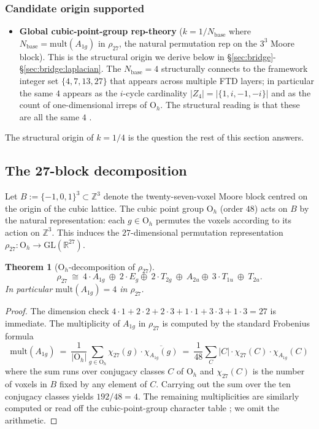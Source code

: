 \documentclass[11pt,reqno]{amsart}
\theoremstyle{plain}
\newtheorem{theorem}{Theorem}[section]
\theoremstyle{definition}
\theoremstyle{remark}
\numberwithin{equation}{section}
\newcommand{\Ohgrp}{\mathrm{O}_h}
\newcommand{\Aoneg}{A_{1g}}
\newcommand{\Nbase}{N_{\mathrm{base}}}
\begin{document}
\subsubsection*{Candidate origin supported}

\begin{itemize}
\item \textbf{Global cubic-point-group rep-theory} ($k = 1/\Nbase$
where $\Nbase = \mathrm{mult}(\Aoneg)$ in $\rho_{27}$, the natural
permutation rep on the $3^{3}$ Moore block). This is the structural
origin we derive below in \S\ref{sec:bridge}-\S\ref{sec:bridge:laplacian}.
The $\Nbase = 4$ structurally connects to the framework integer set
$\{4, 7, 13, 27\}$ that appears across multiple FTD layers; in
particular the same $4$ appears as the $i$-cycle cardinality
$|Z_{4}| = |\{1, i, -1, -i\}|$ and as the count of one-dimensional
irreps of $\Ohgrp$. The structural reading is that these are all
the same $4$ \cite{spinedoc}.
\end{itemize}

The structural origin of $k = 1/4$ is the question the rest of this
section answers.

\subsection{The 27-block decomposition}

Let $B := \{-1, 0, 1\}^{3} \subset \mathbb{Z}^{3}$ denote the
twenty-seven-voxel Moore block centred on the origin of the cubic
lattice. The cubic point group $\Ohgrp$ (order $48$) acts on $B$ by
the natural representation: each $g \in \Ohgrp$ permutes the voxels
according to its action on $\mathbb{Z}^{3}$. This induces the
$27$-dimensional permutation representation $\rho_{27}\colon \Ohgrp
\to \mathrm{GL}(\mathbb{R}^{27})$.

\begin{theorem}[$\Ohgrp$-decomposition of $\rho_{27}$]
\label{thm:rho27}
\begin{equation}
\label{eq:rho27}
  \rho_{27}\ \cong\ 4\!\cdot\!\Aoneg\ \oplus\ 2\!\cdot\!E_{g}
   \oplus\ 2\!\cdot\!T_{2g}\ \oplus\ A_{2u}
   \oplus\ 3\!\cdot\!T_{1u}\ \oplus\ T_{2u}.
\end{equation}
In particular $\mathrm{mult}(\Aoneg) = 4$ in $\rho_{27}$.
\end{theorem}

\begin{proof}
The dimension check $4\!\cdot\!1 + 2\!\cdot\!2 + 2\!\cdot\!3 + 1\!\cdot\!1
+ 3\!\cdot\!3 + 1\!\cdot\!3 = 27$ is immediate. The multiplicity of
$\Aoneg$ in $\rho_{27}$ is computed by the standard Frobenius formula
\[
  \mathrm{mult}(\Aoneg)\ =\ \frac{1}{|\Ohgrp|}\sum_{g \in \Ohgrp}
    \chi_{27}(g)\cdot\overline{\chi_{\Aoneg}(g)}
  \ =\ \frac{1}{48}\sum_{C}|C|\cdot\chi_{27}(C)\cdot\chi_{\Aoneg}(C)
\]
where the sum runs over conjugacy classes $C$ of $\Ohgrp$ and
$\chi_{27}(C)$ is the number of voxels in $B$ fixed by any element
of $C$. Carrying out the sum over the ten conjugacy classes yields
$192/48 = 4$. The remaining multiplicities are similarly computed
or read off the cubic-point-group character table
\cite[\S 4.2]{altmann}; we omit the arithmetic.
\end{proof}
\end{document}
